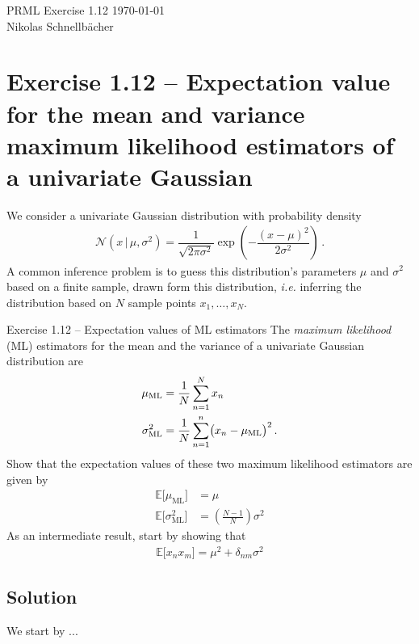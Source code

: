 \documentclass[11pt,DINA4, fleqn]{amsart}
\begin{document}

\tikzset{node distance = 2cm, auto}



\begin{flushleft}
{\sc \Large PRML Exercise 1.12} \hfill \today \\
\medskip
Nikolas Schnellbächer \underline{\hspace{6.53in}} \\
\end{flushleft}

\section*{Exercise 1.12 -- Expectation value for the mean and variance maximum likelihood estimators of a univariate Gaussian}
We consider a univariate Gaussian distribution with probability density
\begin{align}
\mathcal{N}\left(x \,\bigl| \, \mu, \sigma^2\right) = \dfrac{1}{\sqrt{2\pi \sigma^2}}\exp\left(-\dfrac{(x-\mu)^2}{2\sigma^2}\right) \, .
\end{align}
A common inference problem is to guess this distribution's parameters $\mu$ and $\sigma^2$ based on a finite sample, drawn form this distribution, \textit{i.e.}
inferring the distribution based on $N$ sample points $x_1, \dots, x_N$.

\begin{mybox_tc3}{Exercise 1.12 -- Expectation values of ML estimators}
The \emph{maximum likelihood} (ML) estimators for the mean and the variance of a univariate Gaussian distribution are
\begin{align}
\mu_{\text{ML}} &= \dfrac{1}{N} \sum\displaylimits_{n = 1}^{N} x_n \\
\sigma^2_{\text{ML}} &= \dfrac{1}{N} \sum\displaylimits_{n = 1}^{n}\bigl(x_n - \mu_{\text{ML}}\bigl)^2 \, .
\end{align}
Show that the expectation values of these two maximum likelihood estimators are given by
\begin{align}
\mathbb{E}\bigl[\mu_{\text{ML}}\bigl] &= \mu \\
\mathbb{E}\bigl[\sigma^2_{\text{ML}}\bigl] &= \left(\frac{N - 1}{N}\right) \sigma^2
\end{align}
As an intermediate result, start by showing that
\begin{align}
\mathbb{E}\bigl[x_n x_m\bigl] = \mu^2 + \delta_{nm} \sigma^2
\end{align}
\end{mybox_tc3}

\subsection*{Solution}
We start by ...
\end{document}
